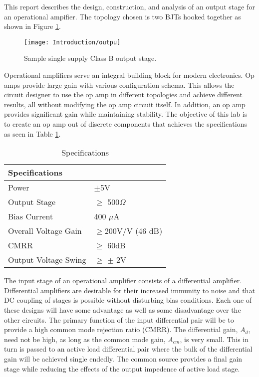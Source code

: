 



This report describes the design, construction, and analysis of an output stage for an operational ampifier. The topology chosen is two BJTs hooked together as shown in Figure \ref{fig:sample}.

\begin{figure}[H]
    \begin{center}
    \texttt{[image: Introduction/outpu]}
    \caption{Sample single supply Class B output stage. \cite{b1}}
    \label{fig:sample}
    \end{center}
    
\end{figure}
Operational amplifiers serve an integral building block for modern electronics. Op amps provide large gain with various configuration schema. This allows the circuit designer to use the op amp in different topologies and achieve different results, all without modifying the op amp circuit itself. In addition, an op amp provides significant gain while maintaining stability. The objective of this lab is to create an op amp out of discrete components that achieves the specifications as seen in Table \ref{tab:labspecs}.


\begin{table}[H]
\centering
\caption{Specifications}
\label{tab:labspecs}
\begin{tabular}{|l|l|}
\hline
\textbf{Specifications} &                 \\ \hline
Power                   & $\pm$5V         \\ \hline
Output Stage 			& $\geq$ 500$\Omega$ \\ \hline
Bias Current            & 400 $\mu$A      \\ \hline
Overall Voltage Gain    & $\geq$200V/V (46 dB)  \\ \hline
CMRR                    & $\geq$ 60dB     \\ \hline
Output Voltage Swing    & $\geq$ $\pm$ 2V \\ \hline
\end{tabular}
\end{table}

The input stage of an operational amplifier consists of a differential amplifier. Differential amplifiers are
desirable for their increased immunity to noise and that DC coupling of stages is possible without disturbing bias conditions. Each one of these designs will have some
advantage as well as some disadvantage over the other circuits. The primary function of the input
differential pair will be to provide a high common mode rejection ratio (CMRR). The differential gain,
$A_d$, need not be high, as long as the common mode gain, $A_{cm}$, is very small. This in turn is passed to an active load differential pair where the bulk of the differential gain will be achieved single endedly. The common source provides a final gain stage while reducing the effects of the output impedence of active load stage. 


